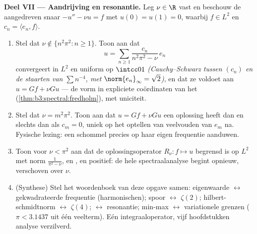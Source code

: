 \begin{problem}
\medskip
\noindent\textbf{Deel VII --- Aandrijving en resonantie.} Leg
$\nu \in \R$ vast en beschouw de aangedreven snaar $-u'' - \nu u
= f$ met $u(0) = u(1) = 0$, waarbij $f \in L^2$ en $c_n = \langle
e_n, f\rangle$.
\begin{enumerate}[resume]
  \item Stel dat $\nu \notin \{n^2\pi^2 : n \geq 1\}$. Toon aan
        dat
        \[
        u = \sum_{n\geq1}\frac{c_n}{n^2\pi^2 - \nu}\,e_n
        \]
        convergeert in $L^2$ en uniform op $\intcc01$
        \emph{(Cauchy--Schwarz tussen $(c_n)$ en de staarten van
        $\sum n^{-4}$, met $\norm{e_n}_\infty = \sqrt2$)}, en dat
        ze voldoet aan $u = Gf + \nu Gu$ --- de vorm in expliciete
        coördinaten van het 
        (\cref{thm:b3:spectral:fredholm}), met uniciteit.
  \item Stel dat $\nu = m^2\pi^2$. Toon aan dat $u = Gf + \nu
        Gu$ een oplossing heeft dan en slechts dan als $c_m = 0$,
        uniek op het optellen van veelvouden van $e_m$ na.
        Fysische lezing: een schommel precies op haar eigen
        frequentie aanduwen.
  \item Toon voor $\nu < \pi^2$ aan dat de oplossingsoperator
        $R_\nu\colon f \mapsto u$ begrensd is op $L^2$ met norm
        $\frac1{\pi^2 - \nu}$, en ,  en
        positief: de hele spectraalanalyse begint opnieuw,
        verschoven over $\nu$.
  \item (Synthese) Stel het woordenboek van deze opgave samen:
        eigenwaarde $\leftrightarrow$ gekwadrateerde frequentie
        (harmonischen); spoor $\leftrightarrow$ $\zeta(2)$;
        hilbert-schmidtnorm $\leftrightarrow$ $\zeta(4)$;
         $\leftrightarrow$ resonantie;
        min-max $\leftrightarrow$ variationele grenzen ($\pi <
        3.1437$ uit één veelterm). Eén integraaloperator, vijf
        hoofdstukken analyse verzilverd.
\end{enumerate}


\end{problem}
